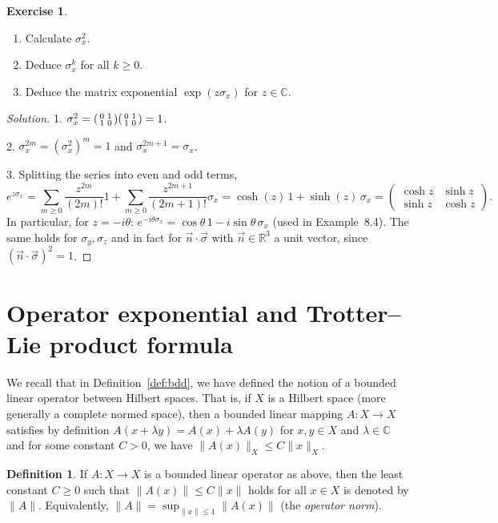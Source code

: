 \documentclass[11pt,a4paper]{article}
\numberwithin{equation}{section}
\newcommand{\R}{\mathbb{R}}
\newcommand{\C}{\mathbb{C}}
\theoremstyle{plain}
\theoremstyle{definition}
\newtheorem{definition}[theorem]{Definition}
\newtheorem{exercise}[theorem]{Exercise}
\theoremstyle{plain}
\theoremstyle{definition}
\newenvironment{solution}{\begin{proof}[Solution]}{\end{proof}}
\begin{document}
\begin{exercise}\label{exo:expsx}
\begin{enumerate}
\item Calculate $\sigma_x^2$.
\item Deduce $\sigma_x^k$ for all $k\geqslant0$.
\item Deduce the matrix exponential $\exp(z\sigma_x)$ for $z\in\C$.
\end{enumerate}
\end{exercise}
\begin{solution}
1. $\sigma_x^2=\begin{psmallmatrix}0&1\\1&0\end{psmallmatrix}\begin{psmallmatrix}0&1\\1&0\end{psmallmatrix}=1$.

2. $\sigma_x^{2m}=(\sigma_x^2)^m=1$ and $\sigma_x^{2m+1}=\sigma_x$.

3. Splitting the series into even and odd terms,
\[
e^{z\sigma_x}=\sum_{m\ge0}\frac{z^{2m}}{(2m)!}1+\sum_{m\ge0}\frac{z^{2m+1}}{(2m+1)!}\sigma_x
=\cosh(z)\,1+\sinh(z)\,\sigma_x=\begin{pmatrix}\cosh z&\sinh z\\\sinh z&\cosh z\end{pmatrix}.
\]
In particular, for $z=-i\theta$: $e^{-i\theta\sigma_x}=\cos\theta\,1-i\sin\theta\,\sigma_x$
(used in Example~8.4). The same holds for $\sigma_y,\sigma_z$ and in fact for
$\vec n\cdot\vec\sigma$ with $\vec n\in\R^3$ a unit vector, since $(\vec n\cdot\vec\sigma)^2=1$.
\end{solution}
\section{Operator exponential and Trotter--Lie product formula}

We recall that in Definition~\ref{def:bdd}, we have defined the notion of a bounded linear
operator between Hilbert spaces. That is, if $X$ is a Hilbert space (more generally a
complete normed space), then a bounded linear mapping $A:X\to X$ satisfies by definition
$A(x+\lambda y)=A(x)+\lambda A(y)$ for $x,y\in X$ and $\lambda\in\C$ and for some constant
$C>0$, we have $\|A(x)\|_X\le C\|x\|_X$.

\begin{definition}
If $A:X\to X$ is a bounded linear operator as above, then the least constant $C\geqslant0$
such that $\|A(x)\|\le C\|x\|$ holds for all $x\in X$ is denoted by $\|A\|$. Equivalently,
$\|A\|=\sup_{\|x\|\le1}\|A(x)\|$ (the \emph{operator norm}).
\end{definition}
\end{document}
